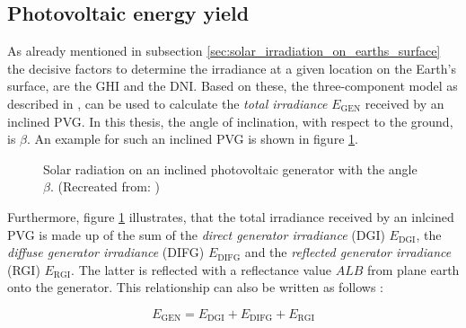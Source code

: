 \subsection{Photovoltaic energy yield} \label{sec:energy_yield}
As already mentioned in subsection \ref{sec:solar_irradiation_on_earths_surface} the decisive factors to determine the irradiance at a given location on the Earth's surface, are the GHI and the DNI. Based on these, the three-component model as described in \cite{Appelbaum:1993, Mertens:2015}, can be used to calculate the \emph{total irradiance} $E_{\mathrm{GEN}}$ received by an inclined PVG. In this thesis, the angle of inclination, with respect to the ground, is $\beta$. An example for such an inclined PVG is shown in figure \ref{fig:tikz_three_component_model}.
\begin{figure}[h!]
	\centering
	
	\caption{Solar radiation on an inclined photovoltaic generator with the angle $\beta$. (Recreated from: \cite{Mertens:2015})}
	\label{fig:tikz_three_component_model}
\end{figure}
Furthermore, figure \ref{fig:tikz_three_component_model} illustrates, that the total irradiance received by an inlcined PVG is made up of the sum of the \emph{direct generator irradiance} (DGI) $E_{\mathrm{DGI}}$, the \emph{diffuse generator irradiance} (DIFG) $E_{\mathrm{DIFG}}$ and the \emph{reflected generator irradiance} (RGI) $E_{\mathrm{RGI}}$. The latter is reflected with a reflectance value $ALB$ from plane earth onto the generator. This relationship can also be written as follows \cite{Bennett:2010, Bertol:2011, Mertens:2015, Bralower:2018}:
\begin{center}
	\begin{equation} \label{eq:e_gen}
		E_{\mathrm{GEN}} = E_{\mathrm{DGI}} + E_{\mathrm{DIFG}} + E_{\mathrm{RGI}}
	\end{equation}
\end{center}

